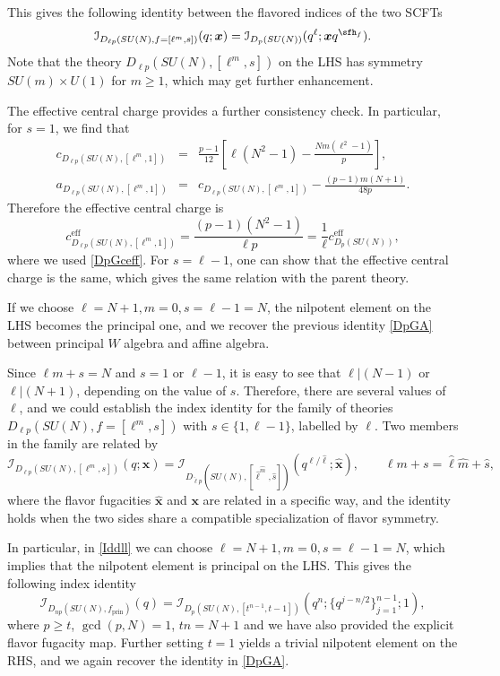 \documentclass[a4paper,11pt]{article}
\theoremstyle{definition}
\theoremstyle{definition}
\theoremstyle{remark}
\newcommand{\ceff}{c^\text{eff}}
\newcommand{\prin}{ \text{prin}}
\newcommand{\be}{\begin{equation}}
\newcommand{\ee}{\end{equation}}
\newcommand{\beqn}{\begin{eqnarray}}
\newcommand{\eeqn}{\end{eqnarray}}
\begin{document}
 
This gives the following identity  between the flavored indices of the two SCFTs
\be \label{Idsfs}
\mathcal{I}_{D_{\ell p}(SU(N),f=[\ell^m, s])}(q; \bm{x}) = \mathcal{I}_{D_p(SU(N))}(q^\ell; \bm{x}q^{\sfh_{f}}).
\ee
Note that the theory $D_{\ell p} (SU(N), [\ell^m,s])$ on the LHS has symmetry   $SU(m)\times U(1) $ for $m\ge 1$, which may get further enhancement. 

 

The effective central charge provides a further consistency check.  In particular, for $s=1$, we find that 
\beqn
c_{D_{\ell p} (SU(N), [\ell^m,1])} &=& 
\frac{p-1}{12}
\left[
\ell(N^2-1)-\frac{Nm(\ell^2-1)}{p}
\right],\\[2mm]
a_{D_{\ell p} (SU(N), [\ell^m,1])} &=&c_{D_{\ell p} (SU(N), [\ell^m,1])}-\frac{(p-1)m(N+1)}{48p}.
\eeqn
Therefore the effective central charge is
\be 
\ceff_{D_{\ell p} (SU(N), [\ell^m,1])}= \frac{(p - 1)(N^2 - 1)}{ \ell p} 
=\frac{1}{\ell}\ceff_{D_{  p} (SU(N) )},
\ee
where we used \eqref{DpGceff}. For $s=\ell-1$, one can show that the effective  central charge is the same, which gives the same relation with the parent theory. 


If we choose  $\ell=N+1, m=0, s=\ell-1=N$,  the nilpotent element on the LHS becomes the  principal  one, and we recover the previous identity \eqref{DpGA} between principal $W$ algebra and affine algebra. 

 Since $\ell m+s=N$ and $s=1$ or $\ell-1$, it is easy to see that $\ell |(N-1)$ or $\ell|(N+1)$, depending on the value of $s$. Therefore, there are several values of $\ell$, and we could  establish the index identity for the   family of theories $ D_{\ell p}(SU(N),f=[\ell^m, s])$ with $s\in \{1,\ell-1\}$, labelled by $\ell$. Two members in the family are related by
\be\label{Iddll}
\mathcal{I}_{D_{\ell  p}(SU(N), [\ell^m,s ])}(q; \bm x) 
=\mathcal{I}_{D_{\hat\ell p}(SU(N), [  \hat\ell  ^{\hat m},\hat s ])}(q^{ \ell/\hat\ell}; \widehat {\bm x})  , 
\qquad \ell  m+s=\hat\ell\hat  m+\hat s,
\ee
where the flavor fugacities $\widehat {\bm x}$ and $\bm x$ are related in a specific way, and the identity holds when the two sides share a compatible  specialization of flavor symmetry.

 
 

In particular, in \eqref{Iddll} we can choose $\ell=N+1, m=0, s=\ell-1=N $, which implies that the nilpotent element is principal on the LHS. 
This   gives the following index identity
 \be\label{Idds}
\mathcal{I}_{D_{n  p}(SU(N),f_\prin)}(q)
=\mathcal{I}_{D_{  p}(SU(N), [  t  ^{  n-1}, t-1 ])}(q^{ n};  \{q^{j-n/2} \}_{j=1}^{n-1}; 1),
\ee 
%
where $p\geq t$,   $\gcd(p,N)=1$, $tn= N+1 $ and we have also provided the explicit flavor fugacity map.  Further setting $t=1$ yields a trivial nilpotent element on the RHS, and we again recover the identity in \eqref{DpGA}.  
\end{document}
